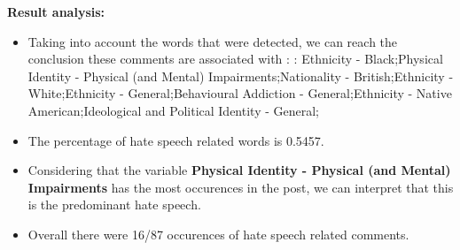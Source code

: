 \documentclass[11pt]{article}
\begin{document}
\textbf{\Large Result analysis:}

\begin{itemize}\item Taking into account the words that were detected, we can reach the conclusion these comments are associated with : : Ethnicity - Black;Physical Identity - Physical (and Mental) Impairments;Nationality - British;Ethnicity - White;Ethnicity - General;Behavioural Addiction - General;Ethnicity - Native American;Ideological and Political Identity - General;%

\item The percentage of hate speech related words is 0.5457.

\item Considering that the variable \textbf{Physical Identity - Physical (and Mental) Impairments} has the most occurences in the post, we can interpret that this is the predominant hate speech.

\item Overall there were 16/87 occurences of hate speech related comments.\end{itemize}
\end{document}
